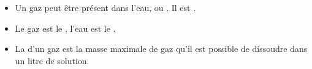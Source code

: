 \begin{mybilan}
	\begin{itemize}
		\item Un gaz peut être présent dans l'eau,  ou . Il est . 
		
		\item Le gaz est le , l'eau est le .
		
		\item La  d'un gaz est la masse maximale de gaz qu'il est possible de dissoudre dans un litre de solution.
	\end{itemize}
\end{mybilan}